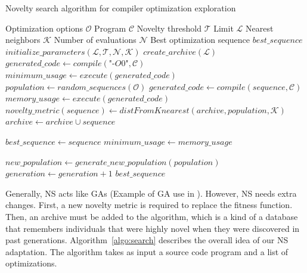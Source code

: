 \begin{algorithm}
	\footnotesize
	\caption{Novelty search algorithm for compiler optimization exploration}
	\label{algo:search}
	\begin{algorithmic}[1]
		
		\REQUIRE Optimization options $\mathcal{O}$
		\REQUIRE Program $\mathcal{C}$
		\REQUIRE Novelty threshold $\mathcal{T}$
		\REQUIRE Limit $\mathcal{L}$
		\REQUIRE Nearest neighbors $\mathcal{K}$
		\REQUIRE Number of evaluations $\mathcal{N}$
		\ENSURE Best optimization sequence $best\_sequence$
		\STATE $initialize\_parameters(\mathcal{L},\mathcal{T},\mathcal{N},\mathcal{K})$
		\STATE $create\_archive(\mathcal{L})$
		\STATE 	$generated\_code \gets compile(\textit{"-O0"},\mathcal{C})$
		\STATE 	$minimum\_usage \gets execute(generated\_code)$
		\STATE $population \gets random\_sequences(\mathcal{O})$
		\REPEAT
		\STATE 	$generated\_code \gets compile(sequence,\mathcal{C})$
		\STATE 	$memory\_usage \gets execute(generated\_code)$
		\STATE	$novelty\_metric(sequence) \gets distFromKnearest(archive,population,\mathcal{K})$
		\STATE	$archive \gets archive \cup sequence$
		\ENDIF
		
		\STATE	$best\_sequence \gets sequence$
		\STATE	$minimum\_usage \gets memory\_usage$
		\ENDIF
		
		\ENDFOR
		\STATE		$new\_population \gets generate\_new\_population(population)$
		\STATE		$generation \gets generation + 1$
		\RETURN $best\_sequence$
	\end{algorithmic}
\end{algorithm}

Generally, NS acts like GAs (Example of GA use in  \cite{cooper2002adaptive}). However, NS needs extra changes. First, a new novelty metric is required to replace the fitness function. Then, an archive must be added to the algorithm, which is a kind of a database that remembers individuals that were highly novel when they were discovered in past generations. 
Algorithm~\ref{algo:search} describes the overall idea of our NS adaptation. The algorithm takes as input a source code program and a list of optimizations. 

